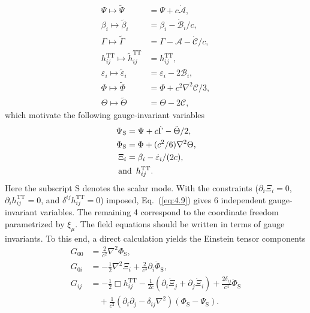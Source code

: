 \documentclass[aps,prd,twocolumn]{revtex4-2}
\newcommand\p{\partial}
\begin{document}
\begin{subequations}
\begin{align}
  \Psi \mapsto \tilde{\Psi} &= \Psi + c\dot{\mathcal{A}}, \\
  \beta_i \mapsto \tilde{\beta}_i &= \beta_i - \dot{\mathcal{B}}_i/c, \\
  \Gamma \mapsto \tilde{\Gamma} &= \Gamma - \mathcal{A} - \dot{\mathcal{C}}/c, \\
  h_{ij}^\mathrm{TT} \mapsto \tilde{h}_{ij}^\mathrm{TT} &= h_{ij}^\mathrm{TT}, \\
  \varepsilon_i \mapsto \tilde{\varepsilon}_i &= \varepsilon_i-2\mathcal{B}_i, \\
  \Phi \mapsto \tilde{\Phi} &= \Phi+c^2\nabla^2\mathcal{C}/3, \\
  \Theta \mapsto \tilde{\Theta} &= \Theta - 2\mathcal{C},
\end{align}
\end{subequations}
which motivate the following gauge-invariant variables
\begin{subequations}\label{eq:4.9}
\begin{align}
  \Psi_\mathrm{S} &= \Psi + c\dot{\Gamma} - \ddot{\Theta}/2, \\
  \Phi_\mathrm{S} &= \Phi + (c^2/6)\nabla^2\Theta, \\
  \Xi_i &= \beta_i - \dot{\varepsilon}_i/(2c), \\
  &\hspace{-3.5mm} \mathrm{and\ \,} h_{ij}^\mathrm{TT}.
\end{align}
\end{subequations}
Here the subscript $\mathrm{S}$ denotes the scalar mode. With the constraints ($\p_i\Xi_i = 0$, $\p_i h_{ij}^\mathrm{TT} = 0$, and $\delta^{ij}h_{ij}^\mathrm{TT} = 0$) imposed, Eq.~(\ref{eq:4.9}) gives 6 independent gauge-invariant variables. The remaining 4 correspond to the coordinate freedom parametrized by $\xi_\mu$. The field equations should be written in terms of gauge invariants. To this end, a direct calculation yields the Einstein tensor components
\begin{subequations}
\begin{align}
  G_{00} &= \frac{2}{c^2}\nabla^2\Phi_\mathrm{S}, \\
  G_{0i} &= - \frac{1}{2}\nabla^2\Xi_i + \frac{2}{c^3}\p_i\dot{\Phi}_\mathrm{S}, \\
  G_{ij} &= - \frac{1}{2}\Box h_{ij}^\mathrm{TT} - \frac{1}{2c}(\p_i\dot{\Xi}_j+\p_j\dot{\Xi}_i) + \frac{2\delta_{ij}}{c^4}\ddot{\Phi}_\mathrm{S} \nonumber\\
    &\quad + \frac{1}{c^2}(\p_i\p_j-\delta_{ij}\nabla^2)(\Phi_\mathrm{S}-\Psi_\mathrm{S}).
\end{align}
\end{subequations}
\end{document}
